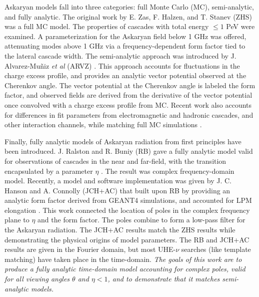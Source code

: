\documentclass[amsmath,amssymb,aps,prd,10pt,twocolumn]{revtex4}
\begin{document}
Askaryan models fall into three categories: full Monte Carlo (MC), semi-analytic, and fully analytic.  The original work by E. Zas, F. Halzen, and T. Stanev (ZHS) \cite{zhs} was a full MC model.  The properties of cascades with total energy $\leq 1$ PeV were examined.  A parameterization for the Askaryan field below 1 GHz was offered, attenuating modes above 1 GHz via a frequency-dependent form factor tied to the lateral cascade width.  The semi-analytic approach was introduced by J. Alvarez-Mu\~{n}iz \textit{et al} (ARVZ) \cite{10.1103/physrevd.84.103003}.  This approach accounts for fluctuations in the charge excess profile, and provides an analytic vector potential observed at the Cherenkov angle.  The vector potential at the Cherenkov angle is labeled the form factor, and observed fields are derived from the derivative of the vector potential once convolved with a charge excess profile from MC.  Recent work also accounts for differences in fit parameters from electromagnetic and hadronic cascades, and other interaction channels, while matching full MC simulations \cite{PhysRevD.101.083005}.

Finally, fully analytic models of Askaryan radiation from first principles have been introduced.  J. Ralston and R. Buniy (RB) gave a fully analytic model valid for observations of cascades in the near and far-field, with the transition encapsulated by a parameter $\eta$ \cite{10.1103/physrevd.65.016003}.  The result was complex frequency-domain model.  Recently, a model and software implementation was given by J. C. Hanson and A. Connolly (JCH+AC) that built upon RB by providing an analytic form factor derived from GEANT4 simulations, and accounted for LPM elongation \cite{10.1016/j.astropartphys.2017.03.008}.  This work connected the location of poles in the complex frequency plane to $\eta$ and the form factor.  The poles combine to form a low-pass filter for the Askaryan radiation.  The JCH+AC results match the ZHS results while demonstrating the physical origins of model parameters.  The RB and JCH+AC results are given in the Fourier domain, but most UHE-$\nu$ searches (like template matching) have taken place in the time-domain.  \textit{The goals of this work are to produce a fully analytic time-domain model accounting for complex poles, valid for all viewing angles $\theta$ and $\eta < 1$, and to demonstrate that it matches semi-analytic models.}
\end{document}
